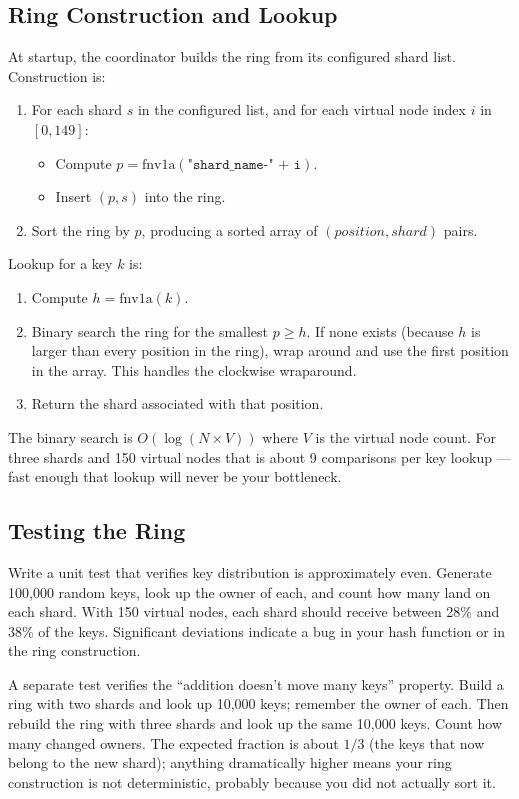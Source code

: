 \documentclass[11pt,a4paper]{article}
\begin{document}
\subsection{Ring Construction and Lookup}
At startup, the coordinator builds the ring from its configured shard list. Construction is:

\begin{enumerate}
\item For each shard $s$ in the configured list, and for each virtual node index $i$ in $[0, 149]$:
\begin{itemize}
\item Compute $p = \text{fnv1a}(\texttt{"shard\_name-" + i})$.
\item Insert $(p, s)$ into the ring.
\end{itemize}
\item Sort the ring by $p$, producing a sorted array of $(position, shard)$ pairs.
\end{enumerate}

Lookup for a key $k$ is:

\begin{enumerate}
\item Compute $h = \text{fnv1a}(k)$.
\item Binary search the ring for the smallest $p \geq h$. If none exists (because $h$ is larger than every position in the ring), wrap around and use the first position in the array. This handles the clockwise wraparound.
\item Return the shard associated with that position.
\end{enumerate}

The binary search is $O(\log(N \times V))$ where $V$ is the virtual node count. For three shards and 150 virtual nodes that is about 9 comparisons per key lookup --- fast enough that lookup will never be your bottleneck.

\subsection{Testing the Ring}
Write a unit test that verifies key distribution is approximately even. Generate 100{,}000 random keys, look up the owner of each, and count how many land on each shard. With 150 virtual nodes, each shard should receive between 28\% and 38\% of the keys. Significant deviations indicate a bug in your hash function or in the ring construction.

A separate test verifies the ``addition doesn't move many keys'' property. Build a ring with two shards and look up 10{,}000 keys; remember the owner of each. Then rebuild the ring with three shards and look up the same 10{,}000 keys. Count how many changed owners. The expected fraction is about $1/3$ (the keys that now belong to the new shard); anything dramatically higher means your ring construction is not deterministic, probably because you did not actually sort it.
\end{document}

